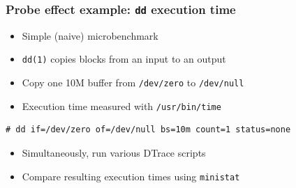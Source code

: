 \begin{frame}[fragile]
  \frametitle{Probe effect example: \texttt{dd} execution time}

  \begin{itemize}
    \item Simple (naive) microbenchmark
    \item \texttt{dd(1)} copies blocks from an input to an output
    \item Copy one 10M buffer from \texttt{/dev/zero} to \texttt{/dev/null}
    \item Execution time measured with \texttt{/usr/bin/time}
  \end{itemize}

  \medskip
  \pause

  \begin{small}
\begin{verbatim}
# dd if=/dev/zero of=/dev/null bs=10m count=1 status=none
\end{verbatim}
  \end{small}

    \medskip
    \pause

  \begin{itemize}
    \item Simultaneously, run various DTrace scripts
    \item Compare resulting execution times using \texttt{ministat}
  \end{itemize}
\end{frame}

